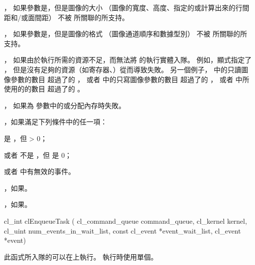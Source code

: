 \item {}，
如果參數是，但是圖像的大小
（圖像的寬度、高度、指定的或計算出來的行間距和/或面間距）
不被  所關聯的所支持。

\item {}，
如果參數是，但是圖像的格式
（圖像通道順序和數據型別）
不被  所關聯的所支持。

\item {}，
如果由於執行所需的資源不足，而無法將  的執行實體入隊。
例如，顯式指定了 ，
但是沒有足夠的資源（如寄存器、）從而導致失敗。
另一個例子， 中的只讀圖像參數的數目
超過了的 ，
或者 中的只寫圖像參數的數目
超過了的 ，
或者 中所使用的的數目
超過了的 。

\item {}，
如果為  參數中的或分配內存時失敗。

\startitem
{}，如果滿足下列條件中的任一項：
\startigBase
\item {} 是 ，但  > 0；
\item 或者  不是 ，但  是 0；
\item 或者  中有無效的事件。
\stopigBase
\stopitem

\item {}，如果\scdevfailres。

\item {}，如果\schostfailres。
\stopigBase


\startCLFUNC
cl_int clEnqueueTask (
		cl_command_queue command_queue,
		cl_kernel kernel,
		cl_uint num_events_in_wait_list,
		const cl_event *event_wait_list,
		cl_event *event)
\stopCLFUNC

此函式所入隊的可以在上執行。
執行時使用單個。

